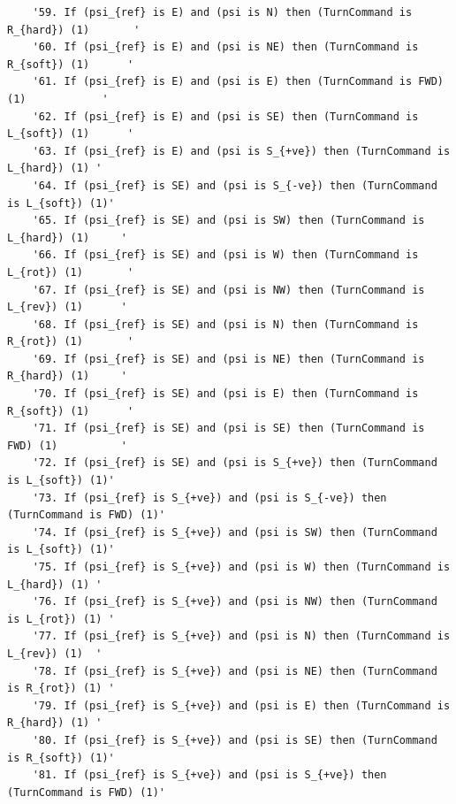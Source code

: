 \documentclass[10pt]{article}
\begin{document}
\begin{verbatim}
    '59. If (psi_{ref} is E) and (psi is N) then (TurnCommand is R_{hard}) (1)       '
    '60. If (psi_{ref} is E) and (psi is NE) then (TurnCommand is R_{soft}) (1)      '
    '61. If (psi_{ref} is E) and (psi is E) then (TurnCommand is FWD) (1)            '
    '62. If (psi_{ref} is E) and (psi is SE) then (TurnCommand is L_{soft}) (1)      '
    '63. If (psi_{ref} is E) and (psi is S_{+ve}) then (TurnCommand is L_{hard}) (1) '
    '64. If (psi_{ref} is SE) and (psi is S_{-ve}) then (TurnCommand is L_{soft}) (1)'
    '65. If (psi_{ref} is SE) and (psi is SW) then (TurnCommand is L_{hard}) (1)     '
    '66. If (psi_{ref} is SE) and (psi is W) then (TurnCommand is L_{rot}) (1)       '
    '67. If (psi_{ref} is SE) and (psi is NW) then (TurnCommand is L_{rev}) (1)      '
    '68. If (psi_{ref} is SE) and (psi is N) then (TurnCommand is R_{rot}) (1)       '
    '69. If (psi_{ref} is SE) and (psi is NE) then (TurnCommand is R_{hard}) (1)     '
    '70. If (psi_{ref} is SE) and (psi is E) then (TurnCommand is R_{soft}) (1)      '
    '71. If (psi_{ref} is SE) and (psi is SE) then (TurnCommand is FWD) (1)          '
    '72. If (psi_{ref} is SE) and (psi is S_{+ve}) then (TurnCommand is L_{soft}) (1)'
    '73. If (psi_{ref} is S_{+ve}) and (psi is S_{-ve}) then (TurnCommand is FWD) (1)'
    '74. If (psi_{ref} is S_{+ve}) and (psi is SW) then (TurnCommand is L_{soft}) (1)'
    '75. If (psi_{ref} is S_{+ve}) and (psi is W) then (TurnCommand is L_{hard}) (1) '
    '76. If (psi_{ref} is S_{+ve}) and (psi is NW) then (TurnCommand is L_{rot}) (1) '
    '77. If (psi_{ref} is S_{+ve}) and (psi is N) then (TurnCommand is L_{rev}) (1)  '
    '78. If (psi_{ref} is S_{+ve}) and (psi is NE) then (TurnCommand is R_{rot}) (1) '
    '79. If (psi_{ref} is S_{+ve}) and (psi is E) then (TurnCommand is R_{hard}) (1) '
    '80. If (psi_{ref} is S_{+ve}) and (psi is SE) then (TurnCommand is R_{soft}) (1)'
    '81. If (psi_{ref} is S_{+ve}) and (psi is S_{+ve}) then (TurnCommand is FWD) (1)'
\end{verbatim}
\end{document}
